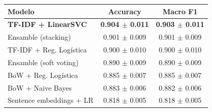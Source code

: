 \begin{tabular}{lcc}
\toprule
\textbf{Modelo} & \textbf{Accuracy} & \textbf{Macro F1} \\
\midrule
\textbf{TF-IDF + LinearSVC} & \textbf{0.904 $\pm$ 0.011} & \textbf{0.903 $\pm$ 0.011} \\
Ensamble (stacking) & 0.901 $\pm$ 0.009 & 0.901 $\pm$ 0.009 \\
TF-IDF + Reg. Logística & 0.900 $\pm$ 0.010 & 0.900 $\pm$ 0.010 \\
Ensamble (soft voting) & 0.890 $\pm$ 0.009 & 0.890 $\pm$ 0.009 \\
BoW + Reg. Logística & 0.885 $\pm$ 0.007 & 0.885 $\pm$ 0.007 \\
BoW + Naive Bayes & 0.883 $\pm$ 0.006 & 0.882 $\pm$ 0.006 \\
Sentence embeddings + LR & 0.818 $\pm$ 0.005 & 0.818 $\pm$ 0.005 \\
\bottomrule
\end{tabular}
